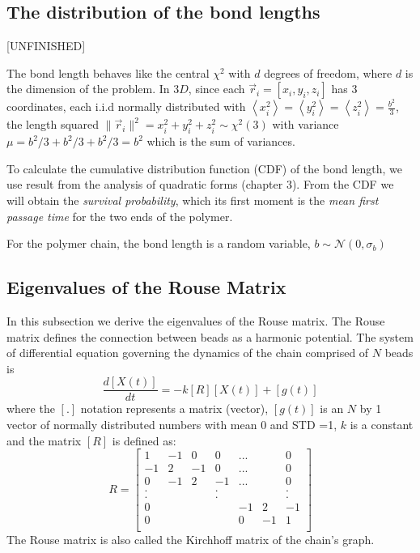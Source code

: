 \documentclass{report}
\begin{document}
\subsection{The distribution of the bond lengths}\label{subsection_distributionOfTheBondLength}
[UNFINISHED] 

The bond length behaves like the central $\chi ^2$ with $d$ degrees of freedom, where $d$ is the dimension of the problem. 
In $3D$, since each $\vec{r}_i=[x_i,y_i,z_i]$ has 3 coordinates, each i.i.d normally distributed with $\left<x_i^2\right>=\left<y_i^2\right>=\left<z_i^2\right>=\frac{b^2}{3}$, the length squared $\|\vec{r}_i\|^2=x_i^2+y_i^2+z_i^2\sim\chi^2(3)$ 
with variance $\mu=b^2/3+b^2/3+b^2/3=b^2$ which is the sum of variances.

To calculate the cumulative distribution function (CDF) of the bond length, we use result from the analysis of quadratic forms \cite{mathai1992quadratic} (chapter 3). From the CDF we will obtain the \textit{survival probability}, which its first moment is the \textit{mean first passage time} for the two ends of the polymer.

For the polymer chain, the bond length is a random variable, $b\sim \mathcal{N}(0,\sigma_b)$
\subsection{Eigenvalues of the Rouse Matrix}\label{subsection_eigenvaluesOfTheRouseMatrix}
In this subsection we derive the eigenvalues of the Rouse matrix. The Rouse matrix defines the connection between beads as a harmonic potential. The system of differential equation governing the dynamics of the chain comprised of $N$ beads is 
\begin{equation}
\frac{d[X(t)]}{dt}=-k[R][X(t)]+[g(t)]
\end{equation}
where the $[.]$ notation represents a matrix (vector), $[g(t)]$ is an $N$ by 1 vector of normally distributed numbers with mean 0 and STD =1, $k$ is a constant and the matrix $[R]$ is defined as:
\begin{equation}
R=\left[
\begin{matrix}
 1 & -1 &  0 &  0 &...&  &  0 \\
-1 &  2 & -1 &  0 &...&  &  0 \\
 0 & -1 &  2 & -1 &...&  &  0 \\
 . &    &    &  . &   &  &  . \\
 . &    &    &  . &   &  &  . \\
 0 &    &    &    & -1& 2& -1 \\
 0 &    &    &    &  0&-1&  1 \\     
\end{matrix}
\right]
\end{equation}
The Rouse matrix is also called the Kirchhoff matrix of the chain's graph.
\end{document}
